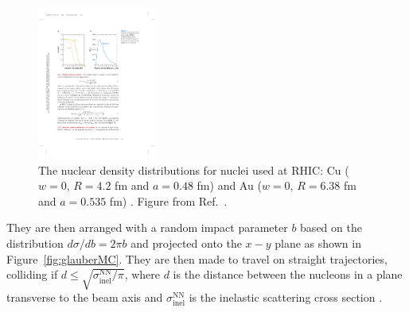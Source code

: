\begin{figure}[htbp]
\begin{center}
\includegraphics[width=0.35\textwidth]{figures/theory/nuclearDensity}
\caption{ The nuclear density distributions for nuclei used at RHIC: Cu ($w = 0$, $R = 4.2$ fm and $a =0.48$ fm)  and Au ($w = 0$, $R = 6.38$ fm and $a =0.535$ fm) \cite{DEVRIES1987495}.
Figure from Ref.~\cite{doi:10.1146/annurev.nucl.57.090506.123020}.}
\label{fig:nuclearDensity}
\end{center}
\end{figure}

They are then arranged with a random impact parameter $b$ based on the distribution $d\sigma/d b = 2\pi b$ and projected onto the $x-y$ plane as shown in Figure~\ref{fig:glauberMC}.
They are then made to travel on straight trajectories, colliding if $d \leq \sqrt{\sigma_{\mathrm{inel}}^{\mathrm{NN}}/ \pi}$, where $d$ is the distance between the nucleons in a plane transverse to the beam axis and $\sigma_{\mathrm{inel}}^{\mathrm{NN}}$ is the inelastic scattering cross section \cite{doi:10.1146/annurev.nucl.57.090506.123020, Alver:2008aq}.


